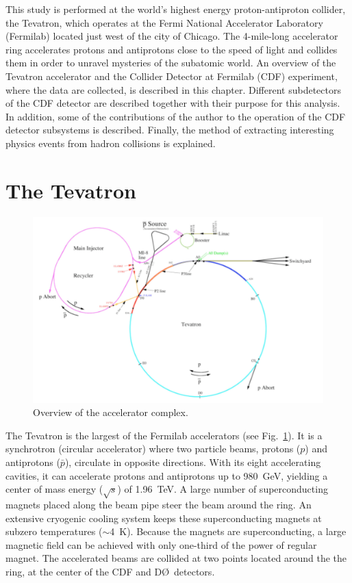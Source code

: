 \vspace{0.015\textheight}
This study is performed at the world's highest energy proton-antiproton collider, the Tevatron, which operates at the Fermi National Accelerator Laboratory (Fermilab) located just west of the city of Chicago. The 4-mile-long accelerator ring accelerates protons and antiprotons close to the speed of light and collides them in order to unravel mysteries of the subatomic world. An overview of the Tevatron accelerator and the Collider Detector at Fermilab (CDF) experiment, where the data are collected, is described in this chapter. Different subdetectors of the CDF detector are described together with their purpose for this analysis. In addition, some of the contributions of the author to the operation of the CDF detector subsystems is described. Finally, the method of extracting interesting physics events from hadron collisions is explained.

\section{The Tevatron}

\begin{figure}[htb!]
\begin{centering}
\includegraphics[scale=0.6]{AcceleratorOverview.pdf}
\caption{Overview of the accelerator complex.}
\label{fig_AcceleratorOverview}
\end{centering}
\end{figure}

The Tevatron is the largest of the Fermilab accelerators (see Fig.~\ref{fig_AcceleratorOverview}). It is a synchrotron (circular accelerator) where two particle beams, protons ($p$) and antiprotons ($\bar{p}$), circulate in opposite directions. With its eight accelerating cavities, it can accelerate protons and antiprotons up to \mbox{980 GeV}, yielding a center of mass energy ($\sqrt{s}$) of \mbox{1.96 TeV}. A large number of superconducting magnets placed along the beam pipe steer the beam around the ring. An extensive cryogenic cooling system keeps these superconducting magnets at subzero temperatures (\mbox{$\sim$4 K}). Because the magnets are superconducting, a large magnetic field can be achieved with only one-third of the power of regular magnet. The accelerated beams are collided at two points located around the the ring, at the center of the CDF and D\O~detectors.

